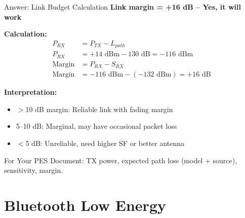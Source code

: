 \documentclass[aspectratio=169,11pt]{beamer}
\begin{document}
\begin{frame}{Answer: Link Budget Calculation}
    \textbf{Link margin = +16 dB -- Yes, it will work}
    
    \vspace{0.3cm}
    \textbf{Calculation:}
    \begin{align*}
        P_{RX} &= P_{TX} - L_{path} \\
        P_{RX} &= +14 \text{ dBm} - 130 \text{ dB} = -116 \text{ dBm} \\
        \text{Margin} &= P_{RX} - S_{RX} \\
        \text{Margin} &= -116 \text{ dBm} - (-132 \text{ dBm}) = +16 \text{ dB}
    \end{align*}
    
    \vspace{0.3cm}
    \textbf{Interpretation:}
    \begin{itemize}
        \item $>$10 dB margin: Reliable link with fading margin
        \item 5--10 dB: Marginal, may have occasional packet loss
        \item $<$5 dB: Unreliable, need higher SF or better antenna
    \end{itemize}
    
    \vspace{0.2cm}
    \begin{block}{For Your PES}
        Document: TX power, expected path loss (model + source), sensitivity, margin.
    \end{block}
\end{frame}

\section{Bluetooth Low Energy}
\end{document}
